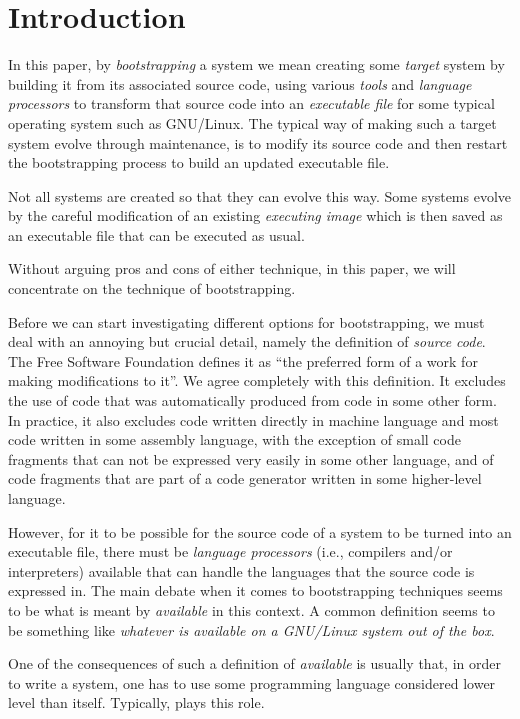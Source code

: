 \section{Introduction}
\label{sec-introduction}

In this paper, by \emph{bootstrapping} a \commonlisp{} system we mean
creating some \emph{target} \commonlisp{} system by building it from
its associated source code, using various \emph{tools} and
\emph{language processors} to transform that source code into an
\emph{executable file} for some typical operating system such as
GNU/Linux.  The typical way of making such a target \commonlisp{}
system evolve through maintenance, is to modify its source code and
then restart the bootstrapping process to build an updated executable
file.

Not all \commonlisp{} systems are created so that they can evolve this
way.  Some systems evolve by the careful modification of an existing
\emph{executing image} which is then saved as an executable file that
can be executed as usual.

Without arguing pros and cons of either technique, in this paper, we
will concentrate on the technique of bootstrapping.

Before we can start investigating different options for bootstrapping,
we must deal with an annoying but crucial detail, namely the
definition of \emph{source code}.  The Free Software Foundation
defines it as ``the preferred form of a work for making modifications
to it''.  We agree completely with this definition.  It excludes the
use of code that was automatically produced from code in some other
form.  In practice, it also excludes code written directly in machine
language and most code written in some assembly language, with the
exception of small code fragments that can not be expressed very
easily in some other language, and of code fragments that are part of
a code generator written in some higher-level language.

However, for it to be possible for the source code of a \commonlisp{}
system to be turned into an executable file, there must be
\emph{language processors} (i.e., compilers and/or interpreters)
available that can handle the languages that the source code is
expressed in.  The main debate when it comes to bootstrapping
techniques seems to be what is meant by \emph{available} in this
context.  A common definition seems to be something like
\emph{whatever is available on a GNU/Linux system out of the box}.

One of the consequences of such a definition of \emph{available} is
usually that, in order to write a \commonlisp{} system, one has to use
some programming language considered lower level than \commonlisp{}
itself.  Typically, \clanguage{} plays this role.

